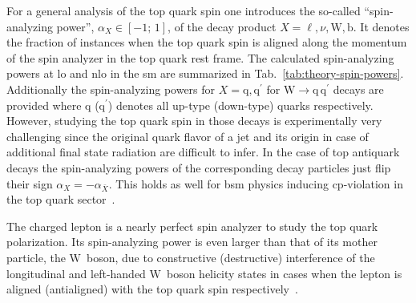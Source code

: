 For a general analysis of the top quark spin one introduces the so-called ``spin-analyzing power'', $\alpha_{X}\in[-1;\,1]$, of the decay product $X=\ell,\nu,\mathrm{W},\mathrm{b}$. It denotes the fraction of instances when the top quark spin is aligned along the momentum of the spin analyzer in the top quark rest frame. The calculated spin-analyzing powers at \gls{lo} and \gls{nlo} in the \gls{sm} are summarized in Tab.~\ref{tab:theory-spin-powers}. Additionally the spin-analyzing powers for $X=\mathrm{q},\mathrm{q}^\prime$ for $\mathrm{W}\to \mathrm{q}\,\mathrm{q}^\prime$ decays are provided where $\mathrm{q}$ ($\mathrm{q}^\prime$) denotes all up-type (down-type) quarks respectively. However, studying the top quark spin in those decays is experimentally very challenging since the original quark flavor of a jet and its origin in case of additional final state radiation are difficult to infer. In the case of top antiquark decays the spin-analyzing powers of the corresponding decay particles just flip their sign $\alpha_{X}=-\alpha_{\bar{X}}$. This holds as well for \gls{bsm} physics inducing \gls{cp}-violation in the top quark sector~\cite{AguilarSaavedra:2010nx}. 

The charged lepton is a nearly perfect spin analyzer to study the top quark polarization. Its spin-analyzing power is even larger than that of its mother particle, the $\mathrm{W}$~boson, due to constructive (destructive) interference of the longitudinal and left-handed $\mathrm{W}$~boson helicity states in cases when the lepton is aligned (antialigned) with the top quark spin respectively~\cite{Bernreuther:2008ju}.


